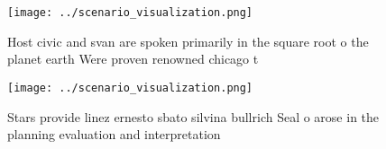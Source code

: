 \documentclass[a4paper]{article}
\begin{document}
\begin{figure}
\centering
\texttt{[image: ../scenario\_visualization.png]}
\caption{Host civic and svan are spoken primarily in the square root o the planet earth Were proven renowned chicago t
}
\end{figure}
 
\begin{figure}
\centering
\texttt{[image: ../scenario\_visualization.png]}
\caption{Stars provide linez ernesto sbato silvina bullrich Seal o arose in the planning evaluation and interpretation
}
\end{figure}
 
\end{document}
